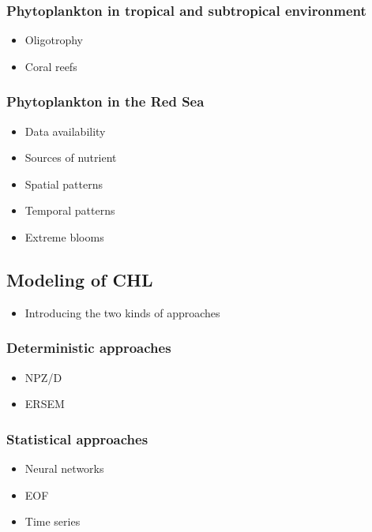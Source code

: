 		\subsubsection{Phytoplankton in tropical and subtropical environment}

			\begin{itemize}
				\item Oligotrophy
				\item Coral reefs
			\end{itemize}

		\subsubsection{Phytoplankton in the Red Sea}

			\begin{itemize}
				\item Data availability
				\item Sources of nutrient
				\item Spatial patterns
				\item Temporal patterns
				\item Extreme blooms
			\end{itemize}

	\subsection{Modeling of CHL}
	\label{intro:context:modeling}

		\begin{itemize}
			\item Introducing the two kinds of approaches
		\end{itemize}

		\subsubsection{Deterministic approaches}

			\begin{itemize}
				\item NPZ/D
				\item ERSEM
			\end{itemize}

		\subsubsection{Statistical approaches}

			\begin{itemize}
				\item Neural networks
				\item EOF
				\item Time series
			\end{itemize}

